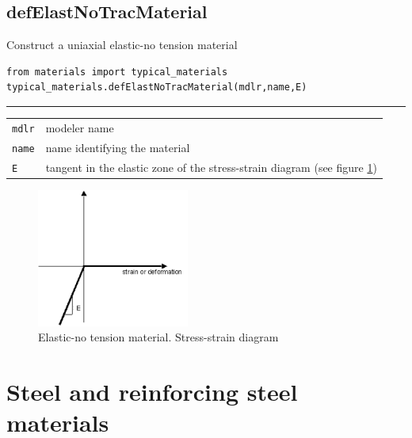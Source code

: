 \subsection{defElastNoTracMaterial}
\noindent Construct a uniaxial elastic-no tension material
\begin{verbatim}
from materials import typical_materials
typical_materials.defElastNoTracMaterial(mdlr,name,E)
\end{verbatim}
\vspace{-10pt}
{\color{grayLines} \rule{\linewidth}{0.25pt}}
\begin{center}
\begin{tabular}{lp{10cm}}
{\tt mdlr} & modeler name \\
{\tt name} & name identifying the material \\
{\tt E} & tangent in the elastic zone of the stress-strain diagram (see figure \ref{ENT}) \\
\end{tabular}
\end{center}
\begin{figure}[h]
\centering
\includegraphics[width=50mm]{materials/figures/ENT}
\caption{Elastic-no tension material. Stress-strain diagram}\label{ENT}
\end{figure}

\section{Steel and reinforcing steel materials}
